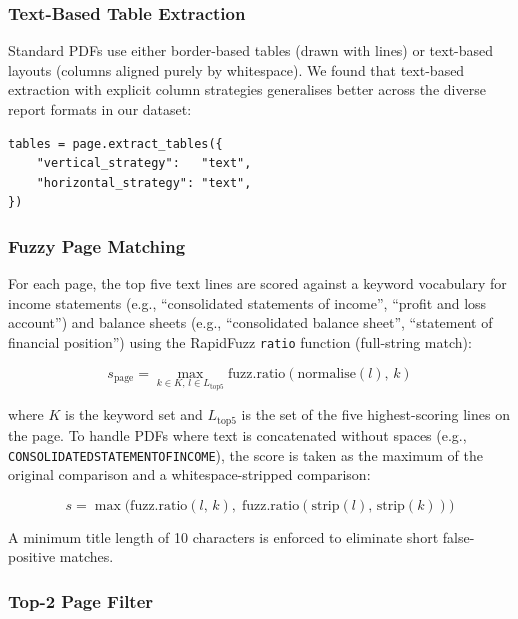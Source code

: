 \documentclass[12pt, a4paper]{article}
\begin{document}
\subsubsection{Text-Based Table Extraction}

Standard PDFs use either border-based tables (drawn with lines) or
text-based layouts (columns aligned purely by whitespace).  We found that
text-based extraction with explicit column strategies generalises better across
the diverse report formats in our dataset:

\begin{verbatim}
tables = page.extract_tables({
    "vertical_strategy":   "text",
    "horizontal_strategy": "text",
})
\end{verbatim}

\subsubsection{Fuzzy Page Matching}

For each page, the top five text lines are scored against a keyword vocabulary
for income statements (e.g., ``consolidated statements of income'',
``profit and loss account'') and balance sheets (e.g., ``consolidated balance
sheet'', ``statement of financial position'') using the RapidFuzz
\texttt{ratio} function (full-string match):

\begin{equation}
  s_{\text{page}} = \max_{k \in K,\, l \in L_{\text{top5}}}
      \text{fuzz.ratio}(\text{normalise}(l),\, k)
\end{equation}

where $K$ is the keyword set and $L_{\text{top5}}$ is the set of the five
highest-scoring lines on the page.  To handle PDFs where text is concatenated
without spaces (e.g., \texttt{CONSOLIDATEDSTATEMENTOFINCOME}), the score
is taken as the maximum of the original comparison and a
whitespace-stripped comparison:

\begin{equation}
  s = \max\!\bigl(\text{fuzz.ratio}(l,\, k),\;
                  \text{fuzz.ratio}(\text{strip}(l),\, \text{strip}(k))\bigr)
\end{equation}

A minimum title length of 10 characters is enforced to eliminate
short false-positive matches.

\subsubsection{Top-2 Page Filter}
\end{document}
